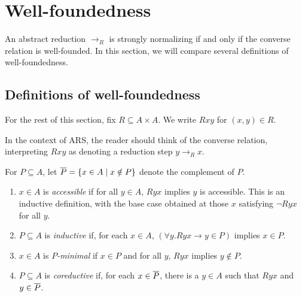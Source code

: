 \section{Well-foundedness}

\newcommand{\then}{\Longrightarrow}
\label{sec:Well-foundedness}



An abstract reduction $\to_R$ is strongly normalizing
if and only if the converse relation is well-founded.
In this section, we will compare several definitions of well-foundedness.

\subsection{Definitions of well-foundedness}

For the rest of this section, fix $R \subseteq A \times A$.  We write $Rxy$ for $(x,y) \in R$.

In the context of ARS, the reader should think of the converse relation, 
interpreting $Rxy$ as denoting a reduction step $y \to_R x$.

For $P \subseteq A$, let $\overline{P} = \{ x \in A \mid x \notin P\}$ denote the complement of $P$.
\begin{definition}\label{def:WFnotions} \hfill 
   \begin{enumerate}
    \item $x \in A$ is \emph{accessible} if for all $y \in A$, $Ryx$ implies $y$ is accessible. 
      This is an inductive definition, with the base case obtained at 
     those $x$ satisfying $\lnot Ryx$ for all $y$.
    \item $P \subseteq A$ is \emph{inductive}
    if, for each $x \in A$, $(\forall y. Ryx \to y \in P)$ implies $x \in P$.


    \item $x \in A$ is \emph{$P$-minimal} if $x \in P$ and for all $y$,
    $Ryx$ implies $y \notin P$.

    \item $P \subseteq A$ is \emph{coreductive} if, for each $x \in \overline{P}$, there is a $y \in A$ such that $Ryx$ and $y \in \overline{P}$. 
    
  \end{enumerate}
\end{definition}

